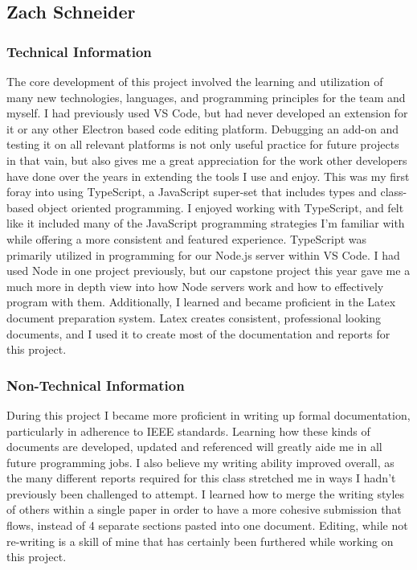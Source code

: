 \documentclass[letterpaper,10pt,titlepage,draftclsnofoot,onecolumn,onesided] {IEEEtran}
\begin{document}
\subsection{Zach Schneider}
\subsubsection{Technical Information}
The core development of this project involved the learning and utilization of many new technologies, languages, and programming principles for the team and myself.
I had previously used VS Code, but had never developed an extension for it or any other Electron based code editing platform.
Debugging an add-on and testing it on all relevant platforms is not only useful practice for future projects in that vain, but also gives me a great appreciation for the work other developers have done over the years in extending the tools I use and enjoy.
This was my first foray into using TypeScript, a JavaScript super-set that includes types and class-based object oriented programming. I enjoyed working with TypeScript, and felt like it included many of the JavaScript programming strategies I'm familiar with while offering a more consistent and featured experience.
TypeScript was primarily utilized in programming for our Node.js server within VS Code.
I had used Node in one project previously, but our capstone project this year gave me a much more in depth view into how Node servers work and how to effectively program with them.
Additionally, I learned and became proficient in the Latex document preparation system.
Latex creates consistent, professional looking documents, and I used it to create most of the documentation and reports for this project. \\

\subsubsection{Non-Technical Information}
During this project I became more proficient in writing up formal documentation, particularly in adherence to IEEE standards. 
Learning how these kinds of documents are developed, updated and referenced will greatly aide me in all future programming jobs.
I also believe my writing ability improved overall, as the many different reports required for this class stretched me in ways I hadn't previously been challenged to attempt.
I learned how to merge the writing styles of others within a single paper in order to have a more cohesive submission that flows, instead of 4 separate sections pasted into one document.
Editing, while not re-writing is a skill of mine that has certainly been furthered while working on this project. \\
\end{document}

